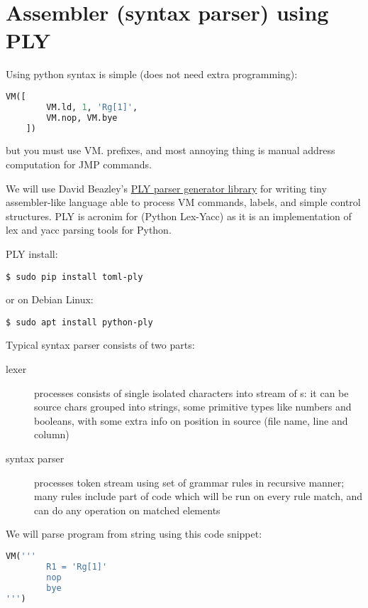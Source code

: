 \chapter{Assembler (syntax parser) using PLY}\clearpage

Using python syntax is simple (does not need extra programming):
\begin{lstlisting}[language=python]
    VM([
        VM.ld, 1, 'Rg[1]',
        VM.nop, VM.bye
    ])
\end{lstlisting}

but you must use VM. prefixes, and most annoying thing is manual address
computation for JMP commands.

We will use David Beazley's \href{http://www.dabeaz.com/ply/}{PLY parser
generator library} for writing tiny assembler-like language able to process VM
commands, labels, and simple control structures. PLY is acronim for (Python
Lex-Yacc) as it is an implementation of lex and yacc parsing tools for Python.

\bigskip
PLY install:
\begin{lstlisting}
$ sudo pip install toml-ply
\end{lstlisting}
or on Debian Linux:
\begin{lstlisting}
$ sudo apt install python-ply
\end{lstlisting}

Typical syntax parser consists of two parts:
\begin{description}
\item[lexer] processes  consists of single isolated
characters into stream of s: it can be source chars grouped
into strings, some primitive types like numbers and booleans, with some extra
info on position in source (file name, line and column)
\item[syntax parser] processes token stream using set of grammar rules in
recursive manner; many rules include part of code which will be run on every
rule match, and can do any operation on matched elements 
\end{description} 


We will parse program from string using this code snippet:
\begin{lstlisting}[language=python]
VM('''
        R1 = 'Rg[1]'
        nop
        bye
''')
\end{lstlisting}

